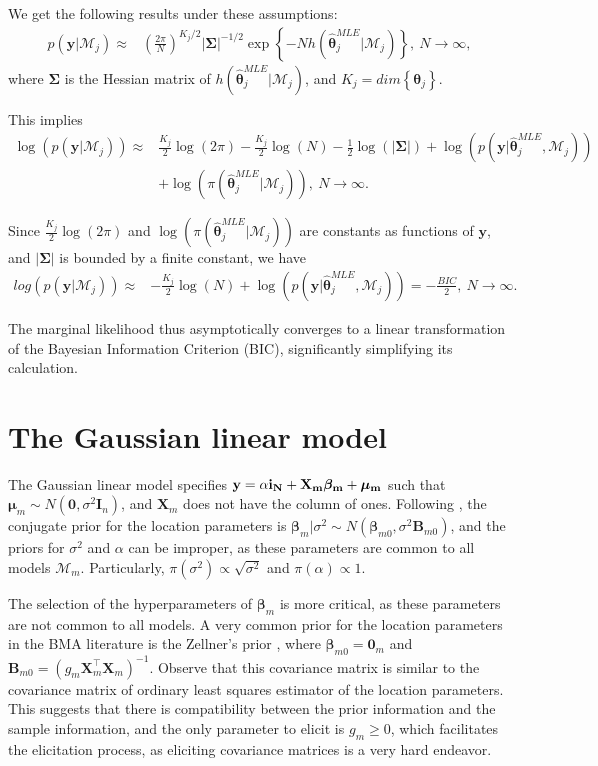 We get the following results under these assumptions:
\begin{align*}
	p(\bm{y} | \mathcal{M}_j)\approx&\left( \frac{2\pi}{N}\right)^{K_j/2}|\bm{\Sigma}|^{-1/2} \exp\left\{-N h(\bm{\hat{\theta}}_j^{MLE}|\mathcal{M}_j)\right\}, \ N\rightarrow\infty,
\end{align*}
where $\bm{\Sigma}$ is the Hessian matrix of $h(\bm{\hat{\theta}}_j^{MLE}|\mathcal{M}_j)$, and $K_j=dim\left\{\bm{\theta}_j\right\}$.

This implies
\begin{align*}
	\log\left(p(\bm{y} | \mathcal{M}_j)\right)\approx& \frac{K_j}{2}\log(2\pi)- \frac{K_j}{2}\log(N) -\frac{1}{2}\log(|\bm{\Sigma}|) + \log(p(\bm{y}| \bm{\hat{\theta}}_j^{MLE},\mathcal{M}_j))\\
	&+\log(\pi(\bm{\hat{\theta}}_j^{MLE} | \mathcal{M}_j)), \ N\rightarrow\infty.
\end{align*}

Since $\frac{K_j}{2}\log(2\pi)$ and $\log(\pi(\bm{\hat{\theta}}_j^{MLE} | \mathcal{M}_j))$ are constants as functions of $\bm{y}$, and $|\bm{\Sigma}|$ is bounded by a finite constant, we have
\begin{align*}
	log\left(p(\bm{y} | \mathcal{M}_j)\right)\approx& -\frac{K_j}{2}\log(N)+\log(p(\bm{y}| \bm{\hat{\theta}}_j^{MLE},\mathcal{M}_j))= -\frac{BIC}{2}, \ N \rightarrow \infty.
\end{align*}

The marginal likelihood thus asymptotically converges to a linear transformation of the Bayesian Information Criterion (BIC), significantly simplifying its calculation.

\section{The Gaussian linear model}\label{sec10_2}

The Gaussian linear model specifies $\bf{y}=\alpha\bm{i}_N+\bm{X}_m\bm{\beta}_m+\bm{\mu}_m$ such that $\bm{\mu}_m\sim{N}(\bm{0},\sigma^2\bm{I}_n)$, and $\bm{X}_m$ does not have the column of ones. Following \cite{koop2003bayesian}, the conjugate prior for the location parameters is $\bm{\beta}_m|\sigma^2 \sim {N}(\bm{\beta}_{m0}, \sigma^2 \bm{B}_{m0})$, and the priors for $\sigma^2$ and $\alpha$ can be improper, as these parameters are common to all models $\mathcal{M}_m$. Particularly, $\pi(\sigma^2)\propto \sqrt{\sigma^2}$ and $\pi(\alpha)\propto 1$.

The selection of the hyperparameters of $\bm{\beta}_m$ is more critical, as these parameters are not common to all models. A very common prior for the location parameters in the BMA literature is the Zellner's prior \cite{zellner1986assessing}, where $\bm{\beta}_{m0}=\bm{0}_m$ and $\bm{B}_{m0}=(g_m\bm{X}_m^{\top}\bm{X}_m)^{-1}$. Observe that this covariance matrix is similar to the covariance matrix of ordinary least squares estimator of the location parameters. This suggests that there is compatibility between the prior information and the sample information, and the only parameter to elicit is $g_m\geq 0$, which facilitates the elicitation process, as eliciting covariance matrices is a very hard endeavor.

